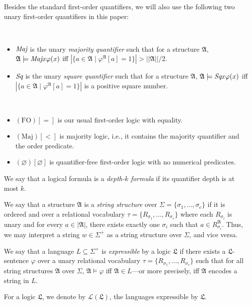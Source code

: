 \documentclass[a4paper,UKenglish,cleveref, autoref, thm-restate, anonymous]{lipics-v2021}
\begin{document}
Besides the standard first-order quantifiers, we will also use the following two unary first-order quantifiers in this paper:
\begin{definition}
    \,
    \begin{itemize}
        \item $\emph{Maj}$ is the unary \emph{majority quantifier} such that for a structure $\mathfrak{A}$, $\mathfrak{A} \models \emph{Maj} x \varphi(x)$ iff $|\{a \in \mathfrak{A} \mid \varphi^\mathfrak{A}[a] = 1\}| > ||\mathfrak{A}|| / 2$.
        \item $\emph{Sq}$ is the unary \emph{square quantifier} such that for a structure $\mathfrak{A}$, $\mathfrak{A} \models \emph{Sq} x \varphi(x)$ iff $|\{a \in \mathfrak{A} \mid \varphi^\mathfrak{A}[a] = 1\}|$ is a positive square number.
    \end{itemize}
\end{definition}

\begin{example}
    \,
    \begin{itemize}
        \item $(\text{FO})[=]$ is our usual first-order logic with equality. 
        \item $(\text{Maj})[<]$ is majority logic, i.e., it contains the majority quantifier and the order predicate. 
        \item $(\varnothing)[\varnothing]$ is quantifier-free first-order logic with no numerical predicates.
    \end{itemize}
\end{example}

\begin{definition}
    We say that a logical formula is a \emph{depth-$k$ formula} if its quantifier depth is at most $k$.
\end{definition}


\begin{definition}
    We say that a structure $\mathfrak{A}$ is a \emph{string structure} over $\Sigma = \{\sigma_1, \dots, \sigma_c\}$ if it is ordered and over a relational vocabulary $\tau = \{R_{\sigma_1}, \dots, R_{\sigma_c}\}$ where each $R_{\sigma_i}$ is unary and for every $a \in |\mathfrak{A}|$, there exists exactly one $\sigma_i$ such that $a \in R_{\sigma_i}^\mathfrak{A}$. Thus, we may interpret a string $w \in \Sigma^+$ as a string structure over $\Sigma$, and vice versa.

    We say that a language $L \subseteq \Sigma^+$ is \emph{expressible} by a logic $\mathfrak{L}$ if there exists a $\mathfrak{L}$-sentence $\varphi$ over a unary relational vocabulary $\tau = \{R_{\sigma_1}, \dots, R_{\sigma_c}\}$ such that for all string structures $\mathfrak{A}$ over $\Sigma$, $\mathfrak{A} \models \varphi$ iff $\mathfrak{A} \in L$---or more precisely, iff $\mathfrak{A}$ encodes a string in $L$.
    
    For a logic $\mathfrak{L}$, we denote by $\mathcal{L}(\mathfrak{L})$, the languages expressible by $\mathfrak{L}$.
\end{definition}
\end{document}
